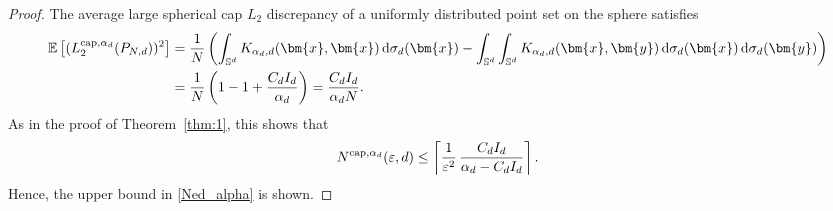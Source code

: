 \documentclass[12pt]{article}
\newcommand{\cp}{{\rm cap}}
\begin{document}
\begin{proof}
The average large spherical cap $L_2$ discrepancy of a uniformly distributed point set on the sphere satisfies
\begin{align*}
\mathbb{E}\left[(L_2^{\cp,\alpha_d}(P_{N,d}))^2\right] & = \frac{1}{N} \left( \int_{\mathbb{S}^d} K_{\alpha_d, d}(\bm{x}, \bm{x}) \,\mathrm{d} \sigma_d(\bm{x}) - \int_{\mathbb{S}^d} \int_{\mathbb{S}^d} K_{\alpha_d, d}(\bm{x}, \bm{y}) \,\mathrm{d} \sigma_d(\bm{x}) \, \mathrm{d} \sigma_d(\bm{y}) \right) \\ & = \frac{1}{N} \left( 1 - 1 + \frac{C_d I_d}{\alpha_d}  \right) = \frac{C_d I_d}{\alpha_d N}.
\end{align*}
As in the proof of Theorem~\ref{thm:1}, this shows that
\begin{equation*}
N^{\cp,\alpha_d}(\varepsilon, d) \le \left\lceil \frac{1}{\varepsilon^2} \, \frac{C_d I_d}{\alpha_d - C_d I_d }\right\rceil.
\end{equation*}
Hence, the upper bound in \eqref{Ned_alpha} is shown.


\end{proof}
\end{document}
